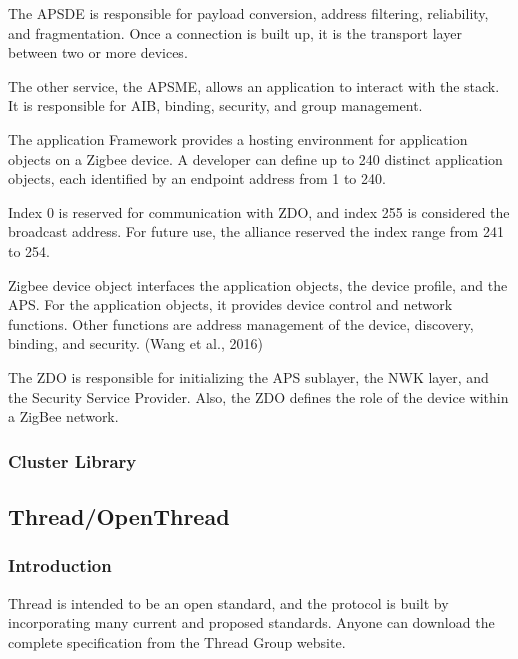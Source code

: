 The APSDE is responsible for payload conversion, address filtering, reliability, and fragmentation. Once a connection is built up, it is the transport layer between two or more devices.

The other service, the APSME, allows an application to interact with the stack. It is responsible for AIB, binding, security, and group management.

The application Framework provides a hosting environment for application objects on a Zigbee device.
A developer can define up to 240 distinct application objects, each identified by an endpoint address from 1 to 240.

Index 0 is reserved for communication with ZDO, and index 255 is considered the broadcast address.
For future use, the alliance reserved the index range from 241 to 254.

Zigbee device object interfaces the application objects, the device profile, and the APS. For the application objects, it provides device control and network functions. Other functions are address management of the device, discovery, binding, and security. (Wang et al., 2016)

The ZDO is responsible for initializing the APS sublayer, the NWK layer, and the Security Service Provider. Also, the ZDO defines the role of the device within a ZigBee network.
\subsubsection{Cluster Library}


\subsection{Thread/OpenThread}
\label{sec:ot}

\subsubsection{Introduction}
\label{sec:ot:intro}
Thread is intended to be an open standard, and the protocol is built by incorporating many
current and proposed standards.\cite{unwala:2018}
Anyone can download the complete specification from the Thread Group website. \cite{thread:130}


